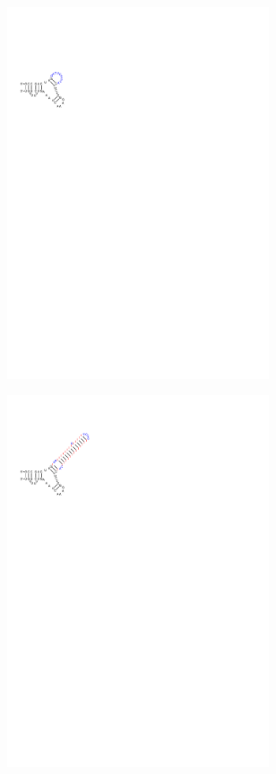 \begin{figure}[H]
\begin{subfigure}{0.3\textwidth}
    \includegraphics[clip, trim=1cm 21cm 14cm 2.5cm, width=0.85\textwidth]{../img/alg-insert/2/multibranch-del}
  \end{subfigure}
  \begin{subfigure}{0.3\textwidth}
    \includegraphics[clip, trim=1cm 21cm 14cm 2.5cm, width=0.85\textwidth]{../img/alg-insert/2/multibranch-del-ins}

\end{subfigure}
\end{figure}
